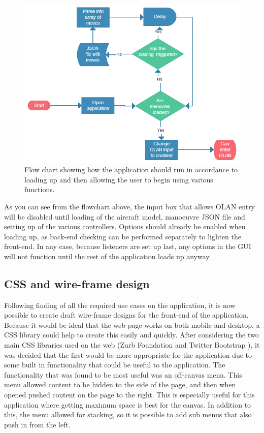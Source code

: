 \begin{figure}[h!]
  \centering
      \includegraphics[width=1\textwidth]{images/flow.png}
  \caption{Flow chart showing how the application should run in accordance to loading up and then allowing the user to begin using various functions.}
  \label{fig:flow}
\end{figure}

As you can see from the flowchart above, the input box that allows OLAN entry will be disabled until loading of the aircraft model, manoeuvre JSON file and setting up of the various controllers. Options should already be enabled when loading up, as back-end checking can be performed separately to lighten the front-end. In any case, because listeners are set up last, any options in the GUI will not function until the rest of the application loads up anyway.

\subsection{CSS and wire-frame design}
Following finding of all the required use cases on the application, it is now possible to create draft wire-frame designs for the front-end of the application. Because it would be ideal that the web page works on both mobile and desktop, a CSS library could help to create this easily and quickly. After considering the two main CSS libraries used on the web (Zurb Foundation \cite{foundation} and Twitter Bootstrap \cite{bootstrap}), it was decided that the first would be more appropriate for the application due to some built in functionality that could be useful to the application. The functionality that was found to be most useful was an off-canvas menu. This menu allowed content to be hidden to the side of the page, and then when opened pushed content on the page to the right. This is especially useful for this application where getting maximum space is best for the canvas. In addition to this, the menu allowed for stacking, so it is possible to add sub menus that also push in from the left. 

